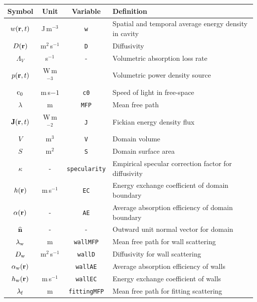 \documentclass[a4paper]{article}
\numberwithin{equation}{section}
\begin{document}
\begin{center}
\begin{supertabular}{|c|c|c|l|}
\hline
\textbf{Symbol}     &\textbf{Unit}   &\textbf{Variable}    &\textbf{Definition} \\
\hline
$w(\boldsymbol{\mathrm{r}},t)$             &J\,m$^{-3}$     &\texttt{w}           &Spatial and temporal average energy density in cavity \\
$D(\boldsymbol{\mathrm{r}})$              &m$^2$\,s$^{-1}$ &\texttt{D}           &Diffusivity \\
$\Lambda _V$        &s$^{-1}$        &-                    &Volumetric absorption loss rate \\
$p(\boldsymbol{\mathrm{r}},t)$             &W\,m$^{-3}$     &~                    &Volumetric power density source \\
$\mathrm{c}_0$             &m\,s${-1}$      &\texttt{c0}          &Speed of light in free-space \\
$\lambda$           &m               &\texttt{MFP}         &Mean free path \\
$\boldsymbol{\mathrm{J}}(\boldsymbol{\mathrm{r}},t)$           &W\,m$^{-2}$     &\texttt{J}           &Fickian energy density flux \\
$V$                 &m$^3$           &\texttt{V}           &Domain volume \\
$S$                 &m$^2$           &\texttt{S}           &Domain surface area \\
$\kappa$            &-               &\texttt{specularity} &Empirical specular correction factor for diffusivity \\
$h(\boldsymbol{\mathrm{r}})$              &m\,s$^{-1}$     &\texttt{EC}          &Energy exchange coefficient of domain boundary \\
$\alpha(\boldsymbol{\mathrm{r}})$         &-               &\texttt{AE}          &Average absorption efficiency of domain boundary \\
$\widehat{\boldsymbol{\mathrm{n}}}$              &-               &-                    &Outward unit normal vector for domain \\
$\lambda_{\mathrm{w}}$       &m               &\texttt{wallMFP}     &Mean free path for wall scattering \\
$D_{\mathrm{w}}$             &m$^2$\,s$^{-1}$ &\texttt{wallD}       &Diffusivity for wall scattering \\
$\alpha_{\mathrm{w}}(\boldsymbol{\mathrm{r}})$     &~               &\texttt{wallAE}      &Average absorption efficiency of walls \\
$h_{\mathrm{w}}(\boldsymbol{\mathrm{r}})$          &m\,s$^{-1}$     &\texttt{wallEC}      &Energy exchange coefficient of walls \\
$\lambda _{\mathrm{f}}$      &m               &\texttt{fittingMFP}  &Mean free path for fitting scattering \\

\end{supertabular}
\end{center}
\end{document}
